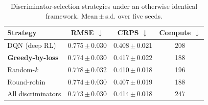 \begin{table}[!t]
\centering
\caption{Discriminator-selection strategies under an otherwise identical framework. Mean\,$\pm$\,s.d. over five seeds.}
\label{tab:selection}
\begin{tabular}{lccc}
\toprule
Strategy & RMSE $\downarrow$ & CRPS $\downarrow$ & Compute $\downarrow$ \\
\midrule
DQN (deep RL) & 0.775\,$\pm$\,0.030 & 0.408\,$\pm$\,0.021 & 208 \\
\textbf{Greedy-by-loss} & 0.774\,$\pm$\,0.030 & 0.417\,$\pm$\,0.022 & 188 \\
Random-$k$ & 0.778\,$\pm$\,0.032 & 0.410\,$\pm$\,0.018 & 196 \\
Round-robin & 0.774\,$\pm$\,0.030 & 0.407\,$\pm$\,0.019 & 188 \\
All discriminators & 0.773\,$\pm$\,0.030 & 0.414\,$\pm$\,0.018 & 247 \\
\bottomrule
\end{tabular}
\end{table}
